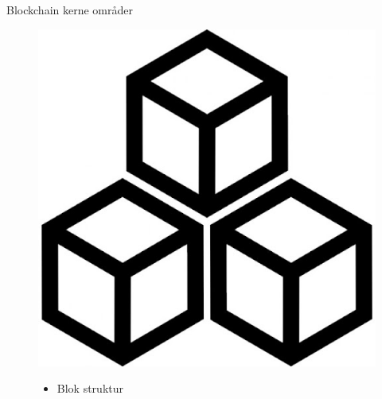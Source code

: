 \documentclass[12pt,t]{beamer}
\begin{document}
\begin{frame}[plain]{Blockchain kerne områder}
		\begin{figure}
	\begin{minipage}[c]{0.1\textwidth}
		\includegraphics[width=\textwidth]{blok.png}
	\end{minipage}
	\begin{minipage}[c]{0.5\textwidth}
		\begin{itemize}
			\item Blok struktur
		\end{itemize}
	\end{minipage}
\end{figure}
	

\end{frame}
\end{document}
